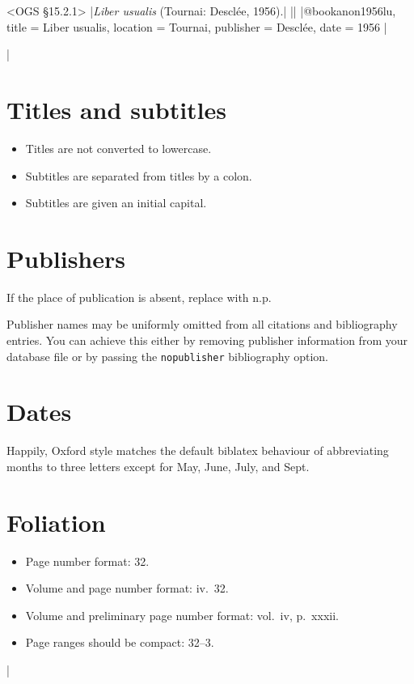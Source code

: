 \documentclass[extrafontsizes,11pt,a4paper,oneside]{memoir}
\begin{document}
\bibexample<OGS \S15.2.1>
|\emph{Liber usualis} (Tournai: Desclée, 1956).|%
||%
|@book{anon1956lu,
  title = {Liber usualis},
  location = {Tournai},
  publisher = {Desclée},
  date = {1956}
}|

\todoc|

\section{Titles and subtitles}

\begin{itemize}
  \item
  Titles are not converted to lowercase.
  
  \item
  Subtitles are separated from titles by a colon.
  
  \item
  Subtitles are given an initial capital.
  \par{}
\end{itemize}

\section{Publishers}

If the place of publication is absent, replace with n.p.

Publisher names may be uniformly omitted from all citations and bibliography entries.
You can achieve this either by removing publisher information from your database file
or by passing the \texttt{nopublisher} bibliography option.

\section{Dates}

Happily, Oxford style matches the default \textsf{biblatex} behaviour of
abbreviating months to three letters except for May, June, July, and Sept.

\section{Foliation}

\begin{itemize}
  \item Page number format: 32.
  \item Volume and page number format: iv.\ 32.
  \item Volume and preliminary page number format: vol.\ iv, p.\ xxxii.
  \item Page ranges should be compact: 32--3.\\
\end{itemize}
|
\end{document}
